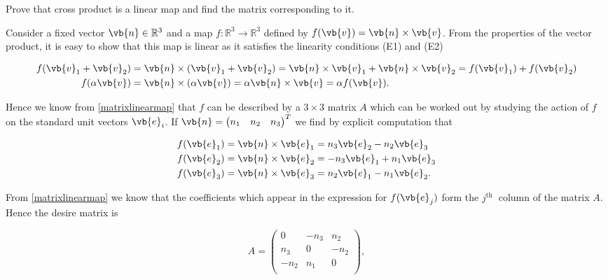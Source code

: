 \documentclass[a4paper,12pt]{report}
\begin{document}
{Prove that cross product is a linear map and find the matrix corresponding to it.}
{Consider a fixed vector \(\vb{n} \in \mathbb{R}^3 \) and a map \(f:\mathbb{R}^3 \rightarrow \mathbb{R}^3 \) defined by \(f(\vb{v} ) = \vb{n} \times \vb{v} \). From the properties of the vector product, it is easy to show that this map is linear as it satisfies the linearity conditions (E1) and (E2)

\begin{equation}
    \begin{aligned}
    f(\vb{v} _{1} + \vb{v} _{2}  ) &= \vb{n} \times (\vb{v} _{1} + \vb{v} _{2} ) = \vb{n} \times \vb{v} _{1} + \vb{n} \times \vb{v} _{2} = f(\vb{v} _{1} ) + f(\vb{v} _{2} ) \\
    f(\alpha \vb{v} ) &= \vb{n} \times (\alpha \vb{v} ) = \alpha \vb{n} \times \vb{v} = \alpha f(\vb{v} ).
    \end{aligned}
\end{equation}

Hence we know from \cref{matrixlinearmap} that \(f\) can be described by a \(3 \times 3\) matrix \(A\) which can be worked out by studying the action of \(f\) on the standard unit vectors \(\vb{e} _{i} \). If \(\vb{n} = \begin{pmatrix}
    n_{1}  & n_{2}  & n_3   \\
\end{pmatrix}^{T} \) we find by explicit computation that 

\begin{equation}
    \begin{aligned}
        f(\vb{e} _{1} ) &= \vb{n} \times \vb{e} _{1} = n_3 \vb{e} _{2} - n_{2} \vb{e} _{3} \\
        f(\vb{e} _{2} ) &= \vb{n} \times \vb{e} _{2}  = -n_3 \vb{e} _{1} + n_{1} \vb{e} _{3} \\
        f(\vb{e} _{3} ) &= \vb{n} \times \vb{e} _{3} = n_{2} \vb{e} _{1} - n_{1} \vb{e} _{2} .  
    \end{aligned}
\end{equation}

From \cref{matrixlinearmap} we know that the coefficients which appear in the expression for \(f(\vb{e} _{j})\) form the \(j^{\text{th }} \) column of the matrix \(A\). Hence the desire matrix is 

\begin{equation} \label{antisym} 
    A = \begin{pmatrix}
        0 & -n_3  & n_{2}   \\
        n_3  & 0 & -n_{2}   \\
        -n_{2}  & n_{1}  & 0  \\
    \end{pmatrix},
\end{equation}

}
\end{document}

